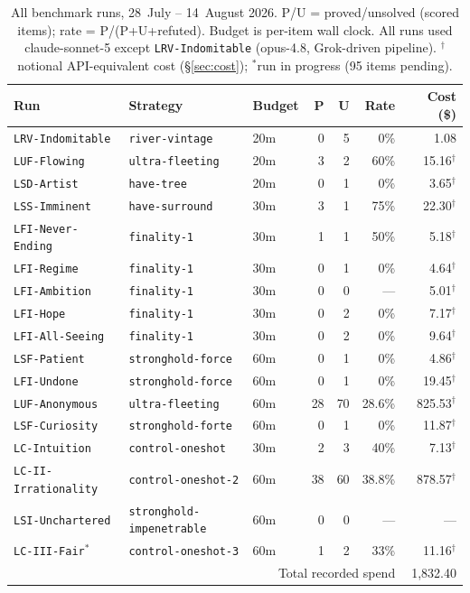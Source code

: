 \documentclass[12pt, a4paper]{article}
\newcommand{\run}[1]{\texttt{#1}}
\begin{document}
\begin{table}[H]
\centering\small
\caption{All benchmark runs, 28~July -- 14~August 2026. P/U = proved/unsolved
(scored items); rate = P/(P+U+refuted). Budget is per-item wall clock. All
runs used claude-sonnet-5 except \run{LRV-Indomitable} (opus-4.8, Grok-driven
pipeline). $^{\dagger}$notional API-equivalent cost (\S\ref{sec:cost});
$^{*}$run in progress (95 items pending).}
\label{tab:ledger}
\begin{tabular}{@{}lllrrrr@{}}
\toprule
Run & Strategy & Budget & P & U & Rate & Cost (\$) \\
\midrule
\run{LRV-Indomitable} & \run{river-vintage} & 20m & 0 & 5 & 0\% & 1.08 \\
\run{LUF-Flowing} & \run{ultra-fleeting} & 20m & 3 & 2 & 60\% & 15.16$^{\dagger}$ \\
\run{LSD-Artist} & \run{have-tree} & 20m & 0 & 1 & 0\% & 3.65$^{\dagger}$ \\
\run{LSS-Imminent} & \run{have-surround} & 30m & 3 & 1 & 75\% & 22.30$^{\dagger}$ \\
\run{LFI-Never-Ending} & \run{finality-1} & 30m & 1 & 1 & 50\% & 5.18$^{\dagger}$ \\
\run{LFI-Regime} & \run{finality-1} & 30m & 0 & 1 & 0\% & 4.64$^{\dagger}$ \\
\run{LFI-Ambition} & \run{finality-1} & 30m & 0 & 0 & --- & 5.01$^{\dagger}$ \\
\run{LFI-Hope} & \run{finality-1} & 30m & 0 & 2 & 0\% & 7.17$^{\dagger}$ \\
\run{LFI-All-Seeing} & \run{finality-1} & 30m & 0 & 2 & 0\% & 9.64$^{\dagger}$ \\
\run{LSF-Patient} & \run{stronghold-force} & 60m & 0 & 1 & 0\% & 4.86$^{\dagger}$ \\
\run{LFI-Undone} & \run{stronghold-force} & 60m & 0 & 1 & 0\% & 19.45$^{\dagger}$ \\
\run{LUF-Anonymous} & \run{ultra-fleeting} & 60m & 28 & 70 & 28.6\% & 825.53$^{\dagger}$ \\
\run{LSF-Curiosity} & \run{stronghold-forte} & 60m & 0 & 1 & 0\% & 11.87$^{\dagger}$ \\
\run{LC-Intuition} & \run{control-oneshot} & 30m & 2 & 3 & 40\% & 7.13$^{\dagger}$ \\
\run{LC-II-Irrationality} & \run{control-oneshot-2} & 60m & 38 & 60 & 38.8\% & 878.57$^{\dagger}$ \\
\run{LSI-Unchartered} & \run{stronghold-impenetrable} & 60m & 0 & 0 & --- & --- \\
\run{LC-III-Fair}$^{*}$ & \run{control-oneshot-3} & 60m & 1 & 2 & 33\% & 11.16$^{\dagger}$ \\
\midrule
\multicolumn{6}{r}{Total recorded spend} & 1{,}832.40 \\
\bottomrule
\end{tabular}
\end{table}
\end{document}
